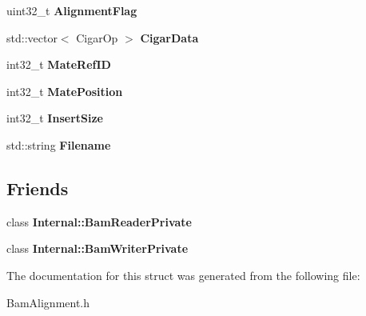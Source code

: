 \begin{DoxyCompactItemize}
\item 
\hypertarget{structBamTools_1_1BamAlignment_a739409d8163868ff3f727d2882312a66}{uint32\-\_\-t {\bfseries Alignment\-Flag}}\label{structBamTools_1_1BamAlignment_a739409d8163868ff3f727d2882312a66}

\item 
\hypertarget{structBamTools_1_1BamAlignment_a3ec8b0b11217cc675b122ed37e2ffa5c}{std\-::vector$<$ Cigar\-Op $>$ {\bfseries Cigar\-Data}}\label{structBamTools_1_1BamAlignment_a3ec8b0b11217cc675b122ed37e2ffa5c}

\item 
\hypertarget{structBamTools_1_1BamAlignment_aaa0ae6c14ff60254ef6b0ca0b58d1bdf}{int32\-\_\-t {\bfseries Mate\-Ref\-I\-D}}\label{structBamTools_1_1BamAlignment_aaa0ae6c14ff60254ef6b0ca0b58d1bdf}

\item 
\hypertarget{structBamTools_1_1BamAlignment_adb32890e8f23da2413b81034bb10016e}{int32\-\_\-t {\bfseries Mate\-Position}}\label{structBamTools_1_1BamAlignment_adb32890e8f23da2413b81034bb10016e}

\item 
\hypertarget{structBamTools_1_1BamAlignment_a3be27931df2810a53d0fc9531df9245d}{int32\-\_\-t {\bfseries Insert\-Size}}\label{structBamTools_1_1BamAlignment_a3be27931df2810a53d0fc9531df9245d}

\item 
\hypertarget{structBamTools_1_1BamAlignment_a92bb1d10231db2f0e5e7c8c40db0c8eb}{std\-::string {\bfseries Filename}}\label{structBamTools_1_1BamAlignment_a92bb1d10231db2f0e5e7c8c40db0c8eb}

\end{DoxyCompactItemize}
\subsection*{Friends}
\begin{DoxyCompactItemize}
\item 
\hypertarget{structBamTools_1_1BamAlignment_a1ff3357da3472115c30e9b3285502bbf}{class {\bfseries Internal\-::\-Bam\-Reader\-Private}}\label{structBamTools_1_1BamAlignment_a1ff3357da3472115c30e9b3285502bbf}

\item 
\hypertarget{structBamTools_1_1BamAlignment_aa01fcc0bfc0452beb435289c61d8dec8}{class {\bfseries Internal\-::\-Bam\-Writer\-Private}}\label{structBamTools_1_1BamAlignment_aa01fcc0bfc0452beb435289c61d8dec8}

\end{DoxyCompactItemize}


The documentation for this struct was generated from the following file\-:\begin{DoxyCompactItemize}
\item 
Bam\-Alignment.\-h\end{DoxyCompactItemize}
